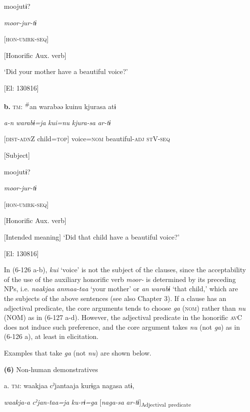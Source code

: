      moojutɨ?

      \textit{moor-jur-tɨ}

      [\textsc{hon}-\textsc{umrk}-\textsc{seq}]

      [Honorific Aux. verb]

      ‘Did your mother have a beautiful voice?’

      [El: 130816]

  \textbf{b.}  \textsc{tm}:  \textsuperscript{\#}an  warabəə  kuinu  kjurasa  atɨ

       \textit{a-n}  \textit{warabɨ=ja}  \textit{kui=nu}  \textit{kjura-sa}  \textit{ar-tɨ}

       [\textsc{dist}-\textsc{adn}Z  child=\textsc{top}]  voice=\textsc{nom}  beautiful-\textsc{adj}  \textsc{st}V-\textsc{seq}

       [Subject]      

      moojutɨ?

      \textit{moor-jur-tɨ}

      [\textsc{hon}-\textsc{umrk}-\textsc{seq}]

      [Honorific Aux. verb]

      [Intended meaning] ‘Did that child have a beautiful voice?’

      [El: 130816]

In (6-126 a-b), \textit{kui} ‘voice’ is not the subject of the clauses, since the acceptability of the use of the auxiliary honorific verb \textit{moor-} is determined by its preceding NPs, i.e. \textit{naakjaa} \textit{anmaa-taa} ‘your mother’ or \textit{an} \textit{warabɨ} ‘that child,’ which are the subjects of the above sentences (see also Chapter 3). If a clause has an adjectival predicate, the core arguments tends to choose \textit{ga} (\textsc{nom}) rather than \textit{nu} (NOM) as in (6-127 a-d). However, the adjectival predicate in the honorific \textsc{av}C does not induce such preference, and the core argument takes \textit{nu} (not \textit{ga}) as in (6-126 a), at least in elicitation.

Examples that take \textit{ga} (not \textit{nu}) are shown below.

\textbf{(6)}  Non-human demonstratives

  a.  \textsc{tm}:  waakjaa  cˀjantaaja  kurɨga  nagasa  atɨ,

      \textit{waakja-a}  \textit{cˀjan-taa=ja}  \textit{ku-rɨ=ga}  [\textit{naga-sa}  \textit{ar-tɨ}]\textsubscript{Adjectival} \textsubscript{predicate}

